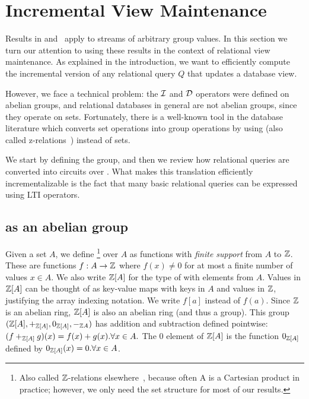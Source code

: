 \section{Incremental View Maintenance}\label{sec:relational}

Results in  and~
apply to streams of arbitrary group values.  In this
section we turn our attention to using these results in the context of 
relational view maintenance.  As explained in the introduction, we want to
efficiently compute the incremental version of any relational query $Q$
that updates a database view.

However, we face a technical problem: the $\mathcal{I}$ and $\mathcal{D}$ operators were
defined on abelian groups, and relational databases in general are 
not abelian groups, since they operate on sets.  Fortunately, 
there is a well-known tool in the database literature
which converts set operations into group operations by using \zrs
(also called z-relations~\cite{green-pods07}) instead of sets.

We start by defining the \zrs group, and then we review how 
relational queries are converted into \dbsp circuits  over \zrs.  
What makes this translation efficiently incrementalizable is the fact that
many basic relational queries can be expressed using LTI \zr operators.

\subsection{\zrs as an abelian group}

Given a set $A$, we define \footnote{Also called $\mathbb{Z}$-relations
elsewhere~\cite{green-tcs11}, because often A is a Cartesian product in practice;
however, we only need the set structure for most of our results.}
over $A$ as functions with \emph{finite support} from $A$ to $\mathbb{Z}$.  
These are functions $f: A \rightarrow \mathbb{Z}$ where 
$f(x) \not= 0$ for at most a finite number of values $x \in A$.
We also write $\mathbb{Z}[A]$ for the type of \zrs with elements from $A$.
Values in $\mathbb{Z}[A]$ can be thought of as key-value maps with 
keys in $A$ and values in $\mathbb{Z}$, justifying the array indexing notation.
We write $f[a]$ instead of $f(a)$.
Since $\mathbb{Z}$ is an abelian ring, $\mathbb{Z}[A]$ is also an abelian ring (and thus a group).  This group
$(\mathbb{Z}[A], +_{\mathbb{Z}[A]}, 0_{\mathbb{Z}[A]}, -_{\mathbb{Z}{A}})$ has addition and subtraction defined pointwise: 
$(f +_{\mathbb{Z}[A]} g)(x) = f(x) + g(x) . \forall x \in A.$  
The $0$ element of $\mathbb{Z}[A]$ is the function $0_{\mathbb{Z}[A]}$ defined by $0_{\mathbb{Z}[A]}(x) = 0 . 
\forall x \in A$.

